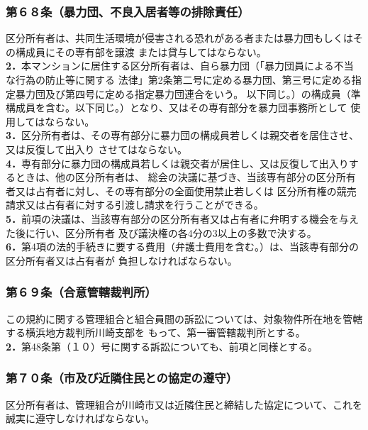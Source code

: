 \documentclass[
  luatex,
  paper=a4paper,
  fontsize=11pt,
  jafontsize=10pt,
  jlreq_notes,
]{jlreq}
\begin{document}
  \subsubsection*{第６８条（暴力団、不良入居者等の排除責任）}
  区分所有者は、共同生活環境が侵害される恐れがある者または暴力団もしくはその構成員にその専有部を譲渡
  または貸与してはならない。\\
  \textbf{2．}本マンションに居住する区分所有者は、自ら暴力団（「暴力団員による不当な行為の防止等に関する
  法律」第2条第二号に定める暴力団、第三号に定める指定暴力団及び第四号に定める指定暴力団連合をいう。
  以下同じ。）の構成員（準構成員を含む。以下同じ。）となり、又はその専有部分を暴力団事務所として
  使用してはならない。\\
  \textbf{3．}区分所有者は、その専有部分に暴力団の構成員若しくは親交者を居住させ、又は反復して出入り
  させてはならない。\\
  \textbf{4．}専有部分に暴力団の構成員若しくは親交者が居住し、又は反復して出入りするときは、他の区分所有者は、
  総会の決議に基づき、当該専有部分の区分所有者又は占有者に対し、その専有部分の全面使用禁止若しくは
  区分所有権の競売請求又は占有者に対する引渡し請求を行うことができる。\\
  \textbf{5．}前項の決議は、当該専有部分の区分所有者又は占有者に弁明する機会を与えた後に行い、区分所有者
  及び議決権の各4分の3以上の多数で決する。\\
  \textbf{6．}第4項の法的手続きに要する費用（弁護士費用を含む。）は、当該専有部分の区分所有者又は占有者が
  負担しなければならない。
  \subsubsection*{第６９条（合意管轄裁判所）}
  この規約に関する管理組合と組合員間の訴訟については、対象物件所在地を管轄する横浜地方裁判所川崎支部を
  もって、第一審管轄裁判所とする。\\
  \textbf{2．}第48条第（１０）号に関する訴訟についても、前項と同様とする。
  \subsubsection*{第７０条（市及び近隣住民との協定の遵守）}
  区分所有者は、管理組合が川崎市又は近隣住民と締結した協定について、これを誠実に遵守しなければならない。
\end{document}
